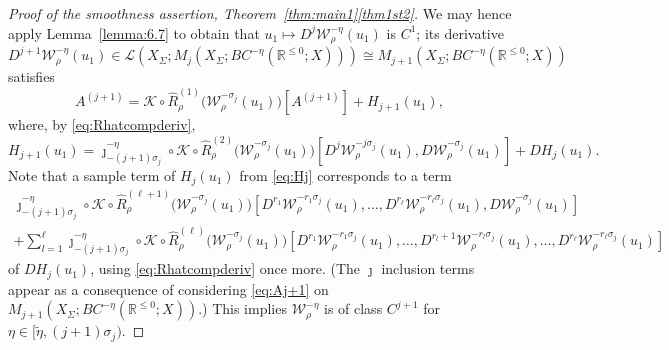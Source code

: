 \documentclass[a4paper, 12pt, oneside, reqno, notitlepage]{amsart}
\theoremstyle{plain}
\theoremstyle{definition}
\theoremstyle{remark}
\begin{document}
\begin{proof}[Proof of the smoothness assertion, Theorem~\ref{thm:main1}\ref{thm1st2}]
We may hence apply Lemma~\ref{lemma:6.7} to obtain that $u_1 \mapsto D^{j} \mathcal{W}^{-\eta}_\rho(u_1)$ is $C^1$; its derivative $D^{j+1}\mathcal{W}^{-\eta}_\rho(u_1) \in \mathcal{L}(X_\Sigma ; M_j(X_\Sigma;BC^{-\eta}(\mathbb{R}^{\leq 0};X))) \cong M_{j+1}(X_\Sigma;BC^{-\eta}(\mathbb{R}^{\leq 0};X)) $ satisfies 
\begin{equation}
     A^{(j+1)}  = \mathcal{K} \circ \widehat{R}_\rho^{(1)} \big(\mathcal{W}_\rho^{- \sigma_j}(u_1) \big)[A^{(j+1)}] + H_{j+1}(u_1),
     \label{eq:Aj+1}
\end{equation}
where, by \eqref{eq:Rhatcompderiv},
\begin{equation}
    H_{j+1}(u_1) = \jmath_{-(j+1) \sigma_j}^{-\eta} \circ  \mathcal{K} \circ \widehat{R}_\rho^{(2)} \big(\mathcal{W}_\rho^{- \sigma_j}(u_1) \big)[D^{j} \mathcal{W}^{-j\sigma_j}_\rho(u_1),D\mathcal{W}_\rho^{- \sigma_j}(u_1)] + DH_j(u_1).
    \label{eq:Hj+1}
\end{equation} 
Note that a sample term of $H_j(u_1)$ from \eqref{eq:Hj} corresponds to a term 
\begin{gather}
       \jmath_{-(j+1) \sigma_j}^{-\eta} \circ\mathcal{K} \circ \widehat{R}_\rho^{(\ell+1)} \big(\mathcal{W}_\rho^{-\sigma_j}(u_1) \big) \left[  D^{r_1} \mathcal{W}_\rho^{-{r_1\sigma_j}}(u_1) ,\ldots,D^{r_\ell} \mathcal{W}_\rho^{-r_\ell{\sigma_j}}(u_1),D \mathcal{W}_\rho^{-\sigma_j}(u_1) \right] \nonumber \\
       +\sum_{l = 1}^\ell \jmath_{-(j+1) \sigma_j}^{-\eta} \circ\mathcal{K} \circ \widehat{R}_\rho^{(\ell)} \big(\mathcal{W}_\rho^{-\sigma_j}(u_1) \big) \left[  D^{r_1} \mathcal{W}_\rho^{-r_1{\sigma_j}}(u_1) ,\ldots,D^{r_l+1} \mathcal{W}_\rho^{-{r_l\sigma_j}}(u_1),\ldots,D^{r_\ell} \mathcal{W}_\rho^{-r_\ell{\sigma_j}}(u_1) \right]
       \label{eq:Hjupdate}
\end{gather}
of $DH_j(u_1)$, using \eqref{eq:Rhatcompderiv} once more.
(The $\jmath$ inclusion terms appear as a consequence of considering \eqref{eq:Aj+1} on $M_{j+1}(X_\Sigma;BC^{-\eta}(\mathbb{R}^{\leq 0};X))$.)
This implies $\mathcal{W}^{-\eta}_\rho$ is of class $C^{j+1}$ for $\eta \in [\tilde{\eta},(j+1)\sigma_j)$.


\end{proof}
\end{document}
